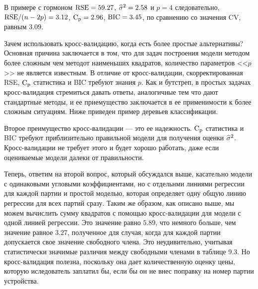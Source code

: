 В примере с гормоном $\text{RSE} = 59.27$, $\widehat{\sigma}^{2} = 2.58$ и $p = 4$ следовательно, $\text{RSE} / (n - 2p) = 3.12$, $\text{C}_{\text{p}} = 2.96$, $\text{BIC} = 3.45$, по сравнению со значения CV, равным 3.09.

Зачем использовать кросс-валидацию, когда есть более простые альтернативы? Основная причина заключается в том, что для задач построения модели методом более сложным чем методот наименьших квадратов, количество параметров <<$p$>> не является известным. В отличие от кросс-валидации, скорректированная RSE, $\text{C}_{\text{p}}$ статистика и BIC требуют знания $p$. Как и бутстреп, в простых задачах кросс-валидация стремиться давать ответы, аналогичные тем что дают стандартные методы, и ее приемущество заключается в ее применимости к более сложным ситуациям. Ниже приведен пример деревьев классификации.

Второе преимущество кросс-валидации --- это ее надежность. $\text{C}_{\text{p}}$ статистика и BIC требуют приблизительно правильной модели для получения оценки $\widehat{\sigma}^{2}$. Кросс-валидации  не требует этого и будет хорошо работать, даже если оцениваемые модели далеки от правильности.

Теперь, ответим на второй вопрос, который обсуждался выше, касательно модели с одинаковыми угловыми коэффициентами, но с отдельнми линиями регрессии для каждой партии и простой моделью, которая определяет одну общую линию регрессии для всех партий сразу. Таким же образом, как описано выше, мы можем вычислить сумму квадратов с помощью кросс-валидации для модели с одной линией регрессии. Это значение равно $5.89$, что немного больше, чем  значение равное $3.27$, полученное для случая, когда для каждой партии допускается свое значение свободного члена. Это неудивительно, учитывая статистически значимые различия между свободными членами в таблице 9.3. Но кросс-валидация полезна, поскольку она дает количественную оценку цены, которую иследователь заплатил бы, если бы он не внес поправку на номер партии устройства.
